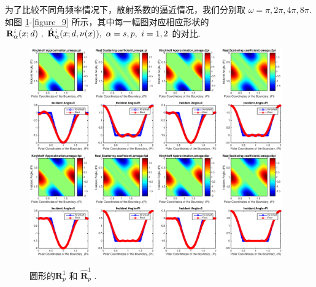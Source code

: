 {为了比较不同角频率情况下，散射系数的逼近情况，我们分别取 $\omega= \pi,2\pi,4\pi,8\pi$.如图 \ref{figure_2}-\ref{figure_9} 所示，其中每一幅图对应相应形状的 $\mathbf{R}_\alpha^i(x;d) \ , \  \hat {\mathbf{R}}_\alpha^i(x;d,\nu(x)), \ \alpha=s,p,  \ i=1,2$ 的对比.
\begin{figure}[htbp]
	\centering
	\includegraphics[width=0.48\textwidth]{./Img/figure_sc_elastic/sc_p1_circle_1.eps}
	\includegraphics[width=0.48\textwidth]{./Img/figure_sc_elastic/sc_p1_circle_2.eps}
	\includegraphics[width=0.48\textwidth]{./Img/figure_sc_elastic/sc_p1_circle_4.eps}
	\includegraphics[width=0.48\textwidth]{./Img/figure_sc_elastic/sc_p1_circle_8.eps}		
	\caption{圆形的$\mathbf{R}_p^1$ 和 $\hat {\mathbf{R}}_p^1$ .}\label{figure_2}
\end{figure}

}

